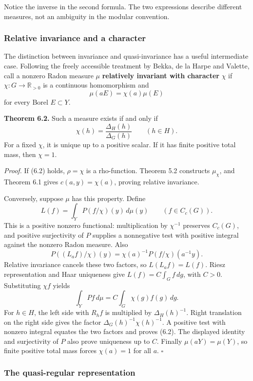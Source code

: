 \documentclass[
  english,
  11pt,
  a4paper,
]{article}
\begin{document}
Notice the inverse in the second formula. The two expressions describe
different measures, not an ambiguity in the modular convention.

\subsubsection{Relative invariance and a
character}\label{quotient-measures-and-weils-integration-formula--relative-invariance-character}

The distinction between invariance and quasi-invariance has a useful
intermediate case. Following the freely accessible treatment by Bekka,
de la Harpe and Valette, call a nonzero Radon measure \(\mu\)
\textbf{relatively invariant with character} \(\chi\) if
\(\chi:G\to\mathbb R_{>0}\) is a continuous homomorphism and
\[\mu(aE)=\chi(a)\mu(E)\] for every Borel \(E\subset Y\).

\textbf{Theorem 6.2.} Such a measure exists if and only if
\[\chi(h)=\frac{\Delta_H(h)}{\Delta_G(h)}\qquad(h\in H).
\tag{6.2}\] For a fixed \(\chi\), it is unique up to a positive scalar.
If it has finite positive total mass, then \(\chi=1\).

\emph{Proof.} If (6.2) holds, \(\rho=\chi\) is a rho-function. Theorem
5.2 constructs \(\mu_\chi\), and Theorem 6.1 gives \(c(a,y)=\chi(a)\),
proving relative invariance.

Conversely, suppose \(\mu\) has this property. Define
\[L(f)=\int_Y P(f/\chi)(y)\,d\mu(y)\qquad(f\in C_c(G)).\] This is a
positive nonzero functional: multiplication by \(\chi^{-1}\) preserves
\(C_c(G)\), and positive surjectivity of \(P\) supplies a nonnegative
test with positive integral against the nonzero Radon measure. Also
\[P((L_af)/\chi)(y)=\chi(a)^{-1}P(f/\chi)(a^{-1}y).\] Relative
invariance cancels these two factors, so \(L(L_af)=L(f)\). Riesz
representation and Haar uniqueness give \(L(f)=C\int_Gf\,dg\), with
\(C>0\). Substituting \(\chi f\) yields
\[\int_Y Pf\,d\mu=C\int_G\chi(g)f(g)\,dg.\] For \(h\in H\), the left
side with \(R_hf\) is multiplied by \(\Delta_H(h)^{-1}\). Right
translation on the right side gives the factor
\(\Delta_G(h)^{-1}\chi(h)^{-1}\). A positive test with nonzero integral
equates the two factors and proves (6.2). The displayed identity and
surjectivity of \(P\) also prove uniqueness up to \(C\). Finally
\(\mu(aY)=\mu(Y)\), so finite positive total mass forces \(\chi(a)=1\)
for all \(a\). \(\square\)

\subsubsection{The quasi-regular
representation}\label{quotient-measures-and-weils-integration-formula--quasi-regular-representation}
\end{document}
